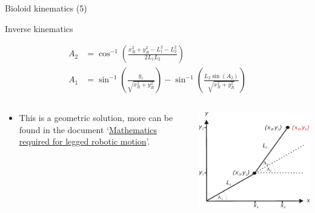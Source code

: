 \documentclass[compress]{beamer}
\begin{document}
\begin{frame}{Bioloid kinematics (5)}

    Inverse kinematics

    \begin{align*}
        A_2 &= \cos^{-1} \left( \frac{x_R^2+y_R^2-L_1^2-L_2^2}{2L_1L_2} \right) \\
        A_1 &= \sin^{-1} \left( \frac{y_r}{\sqrt{x_R^2+y_R^2}} \right)-\sin^{-1}\left( \frac{L_2 \sin(A_2)}{\sqrt{x_R^2+y_R^2}} \right)
    \end{align*}

    \begin{columns}
        \begin{column}{0.5\linewidth}

    \begin{itemize}

        \item This is a geometric solution, more can be found in the document
            `\href{http://www.tribotix.info/Articles\&Tutorials/MathsforRobotics/Mathematics\%20required\%20for\%20Robotic\%20Motion.pdf}{Mathematics
            required for legged robotic motion}'.
    \end{itemize}
        \end{column}
        \begin{column}{0.5\linewidth}
            \begin{center}
                \includegraphics[width=0.8\linewidth]{image32}
            \end{center}
        \end{column}
    \end{columns}

\end{frame}
\end{document}

